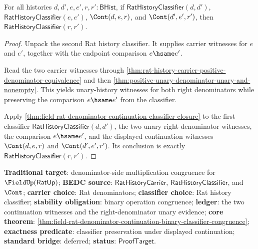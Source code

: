 \begin{theorem}
\label{thm:field-rat-denominator-continuation-binary-classifier-congruence}
For all histories $d,d',e,e',r,r':\mathsf{BHist}$, if
$\mathsf{RatHistoryClassifier}(d,d')$,
$\mathsf{RatHistoryClassifier}(e,e')$, $\Cont(d,e,r)$, and
$\Cont(d',e',r')$, then $\mathsf{RatHistoryClassifier}(r,r')$.
\end{theorem}
\begin{proof}
Unpack the second Rat history classifier. It supplies carrier witnesses for
$e$ and $e'$, together with the endpoint comparison $e\hsame e'$.

Read the two carrier witnesses through
\autoref{thm:rat-history-carrier-positive-denominator-equivalence} and then
\autoref{thm:positive-unary-denominator-unary-and-nonempty}. This yields
unary-history witnesses for both right denominators while preserving the
comparison $e\hsame e'$ from the classifier.

Apply
\autoref{thm:field-rat-denominator-continuation-classifier-closure} to the
first classifier $\mathsf{RatHistoryClassifier}(d,d')$, the two unary
right-denominator witnesses, the comparison $e\hsame e'$, and the displayed
continuation witnesses $\Cont(d,e,r)$ and $\Cont(d',e',r')$. Its conclusion is
exactly $\mathsf{RatHistoryClassifier}(r,r')$.
\end{proof}

\textbf{Traditional target}: denominator-side multiplication congruence for
$\FieldUp(\mathsf{RatUp})$; \textbf{BEDC source}:
$\mathsf{RatHistoryCarrier}$, $\mathsf{RatHistoryClassifier}$, and $\Cont$;
\textbf{carrier choice}: Rat denominators; \textbf{classifier choice}: Rat
history classifier; \textbf{stability obligation}: binary operation
congruence; \textbf{ledger}: the two continuation witnesses and the
right-denominator unary evidence; \textbf{core theorem}:
\autoref{thm:field-rat-denominator-continuation-binary-classifier-congruence};
\textbf{exactness predicate}: classifier preservation under displayed
continuation; \textbf{standard bridge}: deferred; \textbf{status}:
$\mathsf{ProofTarget}$.

